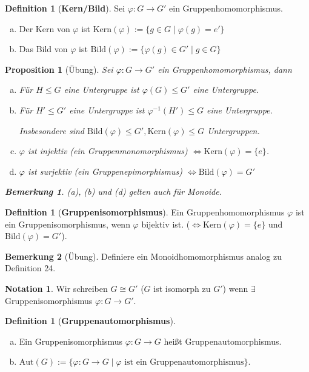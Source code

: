 \documentclass[a4paper]{article}
\theoremstyle{plain}
\newtheorem{prop}[thm]{Proposition}
\theoremstyle{definition}
\newtheorem{defi}[thm]{Definition}
\newtheorem*{bem*}{Bemerkung}
\newtheorem*{nota*}{Notation}
\begin{document}
\begin{defi}[\textbf{Kern/Bild}]
  Sei $\varphi : G \to G'$ ein Gruppenhomomorphismus.
  \begin{enumerate}[(a)]
    \item Der Kern von $\varphi$ ist $\mathrm{Kern}(\varphi) := \{g \in G \mid \varphi(g) = e'\}$
    \item Das Bild von $\varphi$ ist $\mathrm{Bild}(\varphi) := \{\varphi(g) \in G'\mid g \in G\}$
  \end{enumerate}
\end{defi}

\begin{prop}[Übung]
  Sei $\varphi : G \to G'$ ein Gruppenhomomorphismus, dann
  \begin{enumerate}[(a)]
          \item Für $H \le G$ eine Untergruppe ist $\varphi(G) \le G'$ eine Untergruppe.
    \item Für $H' \le G'$ eine Untergruppe ist $\varphi^{-1}(H') \le G$ eine Untergruppe.

          Insbesondere sind $\mathrm{Bild}(\varphi) \le G', \mathrm{Kern}(\varphi) \le G$ Untergruppen.
    \item $\varphi$ ist injektiv (ein Gruppenmonomorphismus) $\iff \mathrm{Kern}(\varphi) = \{e\}$.
    \item $\varphi$ ist surjektiv (ein Gruppenepimorphismus) $\iff \mathrm{Bild}(\varphi) = G'$
  \end{enumerate}
  \begin{bem*}
(a), (b) und (d) gelten auch für Monoide.
  \end{bem*}
\end{prop}

\begin{defi}[\textbf{Gruppenisomorphismus}]
Ein Gruppenhomomorphismus $\varphi$ ist ein Gruppenisomorphismus, wenn $\varphi$ bijektiv ist. ($\iff \mathrm{Kern}(\varphi) = \{e\}$ und $\mathrm{Bild}(\varphi) =G'$).
\end{defi}
\begin{bem*}[Übung]
  Definiere ein Monoidhomomorphismus analog zu Definition 24.
\end{bem*}

\begin{nota*}
  Wir schreiben $G \cong G'$ ($G$ ist isomorph zu $G'$) wenn $\exists$ Gruppenisomorphismus $\varphi : G \to G'$.
\end{nota*}

\begin{defi}[\textbf{Gruppenautomorphismus}]
\begin{enumerate}[(a)]
  \item Ein Gruppenisomorphismus $\varphi : G \to G$ heißt Gruppenautomorphismus.
  \item $\mathrm{Aut}(G):= \{\varphi : G \to G \mid \varphi \text{ ist ein Gruppenautomorphismus}\}$.
\end{enumerate}
\end{defi}
\end{document}
